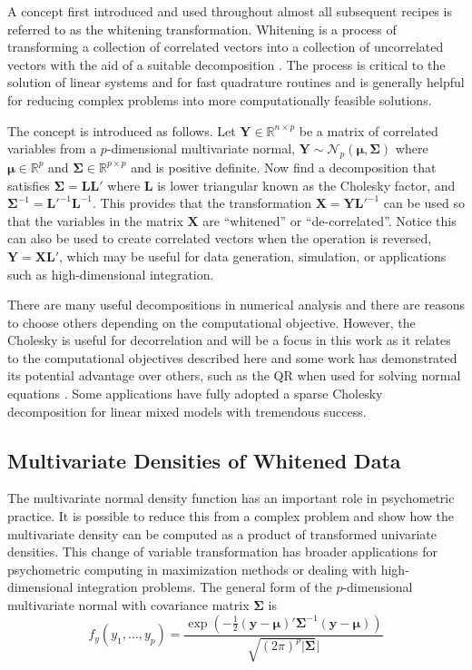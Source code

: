 \documentclass[12pt]{article}
\begin{document}
A concept first introduced and used throughout almost all subsequent recipes is referred to as the whitening transformation. Whitening is a process of transforming a collection of correlated vectors into a collection of uncorrelated vectors with the aid of a suitable decomposition \cite{whiten}. The process is critical to the solution of linear systems and for fast quadrature routines and is generally helpful for reducing complex problems into more computationally feasible solutions. 

The concept is introduced as follows. Let $\bm{Y} \in \mathbb{R}^{n \times p}$ be a matrix of correlated variables from a $p$-dimensional multivariate normal, $\bm{Y} \sim \mathcal{N}_p(\bm{\mu}, \bm{\Sigma})$ where $\bm{\mu} \in \mathbb{R}^{p}$ and $\bm{\Sigma} \in \mathbb{R}^{p \times p}$ and is positive definite. Now find a decomposition that satisfies $\bm{\Sigma} = \bm{L}\bm{L}'$ where $\bm{L}$ is lower triangular known as the Cholesky factor, and $\bm{\Sigma}^{-1} = \bm{L'}^{-1}\bm{L}^{-1}$. This provides that the transformation $\bm{X} = \bm{Y}\bm{L}'^{-1}$ can be used so that the variables in the matrix $\bm{X}$ are ``whitened'' or ``de-correlated''. Notice this can also be used to create correlated vectors when the operation is reversed, $\bm{Y}= \bm{X}\bm{L}'$, which may be useful for data generation, simulation, or applications such as high-dimensional integration. 

There are many useful decompositions in numerical analysis \cite{searle:1982,zhang:matrix} and there are reasons to choose others depending on the computational objective. However, the Cholesky is useful for decorrelation and will be a focus in this work as it relates to the computational objectives described here and some work has demonstrated its potential advantage over others, such as the QR when used for solving normal equations \cite{qr:chol}. Some applications have fully adopted a sparse Cholesky decomposition \cite{tim:davis} for linear mixed models \cite{bates:2004} with tremendous success.  

\subsection*{Multivariate Densities of Whitened Data}

The multivariate normal density function has an important role in psychometric practice. It is possible to reduce this from a complex problem and show how the multivariate density can be computed as a product of transformed univariate densities. This change of variable transformation has broader applications for psychometric computing in maximization methods or dealing with high-dimensional integration problems. The general form of the $p$-dimensional multivariate normal with covariance matrix $\bm{\Sigma}$ is
\begin{equation}
\label{eqn:multivariate}
f_y(y_1, \ldots, y_p)  =  \frac{\exp(-\frac{1}{2}(\bm{y} - \bm{\mu})'\bm{\Sigma}^{-1}(\bm{y} - \bm{\mu}))}{\sqrt{(2\pi)^p|\bm{\Sigma}}|}
\end{equation}
\end{document}
